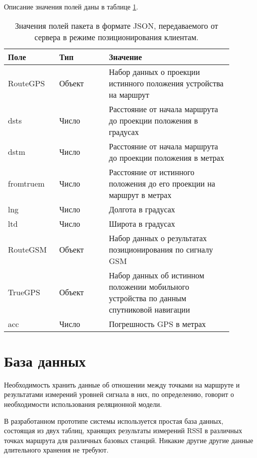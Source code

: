 Описание значения полей даны в таблице \ref{tab:json-perform-format}.

\begin{table}
	\caption{\label{tab:json-perform-format}Значения полей пакета в формате JSON, передаваемого от сервера в режиме позиционирования клиентам.}
	\begin{center}
		\begin{tabular}{|p{0.2\linewidth}|p{0.2\linewidth}|p{0.5\linewidth}|}
			\hline
			Поле & Тип & Значение \\
			\hline
			RouteGPS & Объект & Набор данных о проекции истинного положения устройства на маршрут \\
			\hline
			dsts & Число & Расстояние от начала маршрута до проекции положения в градусах \\
			\hline
			dstm & Число & Расстояние от начала маршрута до проекции положения в метрах \\
			\hline
			fromtruem & Число & Расстояние от истинного положения до его проекции на маршрут в метрах \\
			\hline
			lng & Число & Долгота в градусах \\
			\hline
			ltd & Число & Широта в градусах \\
			\hline
		   	RouteGSM & Объект & Набор данных о результатах позиционирования по сигналу GSM \\
			\hline
			TrueGPS & Объект & Набор данных об истинном положении мобильного устройства по данным спутниковой навигации \\
			\hline
			acc & Число & Погрешность GPS в метрах\\
			\hline
		\end{tabular}
	\end{center}
\end{table}

\section{База данных}
\label{sec:server-db}
Необходимость хранить данные об отношении между точками на маршруте и результатами измерений уровней сигнала в них, по определению, говорит о необходимости использования реляционной модели.

В разработанном прототипе системы используется простая база данных, состоящая из двух таблиц, хранящих результаты измерений RSSI в различных точках маршрута для различных базовых станций. Никакие другие другие данные длительного хранения не требуют.

